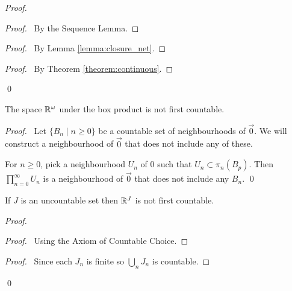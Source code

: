 \begin{proof}
    \pf
    \begin{proof}
        \pf\ By the Sequence Lemma.
    \end{proof}
    \begin{proof}
        \pf\ By Lemma \ref{lemma:closure_net}.
    \end{proof}
    \qedstep
    \begin{proof}
        \pf\ By Theorem \ref{theorem:continuous}.
    \end{proof}
    \qed
\end{proof}

\begin{example}[CC]
    The space $\mathbb{R}^\omega$ under the box product is not first countable.
\end{example}

\begin{proof}
    \pf\ Let $\{ B_n \mid n \geq 0 \}$ be a countable set of neighbourhoods of $\vec{0}$. We will construct a neighbourhood of $\vec{0}$ that does not include any of these.

    For $n \geq 0$, pick a neighbourhood $U_n$ of 0 such that $U_n \subset \pi_n(B_p)$. Then $\prod_{n=0}^\infty U_n$ is a neighbourhood of $\vec{0}$ that does not
    include any $B_n$. \qed
\end{proof}

\begin{example}
    If $J$ is an uncountable set then $\mathbb{R}^J$ is not first countable.
\end{example}

\begin{proof}
    \pf
    \begin{proof}
        \pf\ Using the Axiom of Countable Choice.
    \end{proof}
    \begin{proof}
        \pf\ Since each $J_n$ is finite so $\bigcup_n J_n$ is countable.
    \end{proof}
    \qed
\end{proof}

